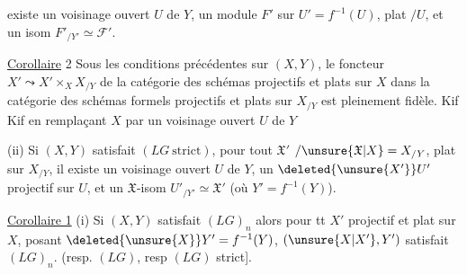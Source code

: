 existe un voisinage ouvert $U$ de $Y$,  un module $F'$ sur $U'=f^{-1}(U)$, plat $/U$, et un isom $F'_{/Y'}\simeq\mathcal F'$.

\uline{Corollaire} 2 Sous les conditions précédentes sur $(X,Y)$,  le foncteur $X'\leadsto X'\times_X X_{/Y}$ de la catégorie des schémas  projectifs et plats sur $X$ dans la catégorie des schémas formels projectifs et plats sur $X_{/Y}$ est pleinement fidèle. Kif Kif en remplaçant $X$ par un voisinage ouvert $U$ de $Y$


(ii) Si $(X,Y)$ satisfait $(LG\ \text{strict})$, pour tout $\mathfrak X'$   $/\unsure{\mathfrak X|X}=X_{/Y}$, plat sur $X_{/Y}$, il existe un voisinage ouvert $U$ de $Y$,  un $\deleted{\unsure{X'}}U'$ projectif   sur $U$, et un $\mathfrak X$-isom $U'_{/Y'}\simeq\mathfrak X'$ (où $Y'=f^{-1}(Y)$).

\uline{Corollaire 1}   (i) Si $(X,Y)$ satisfait $(LG)_n$   alors pour tt $X'$ projectif et plat sur $X$, posant $\deleted{\unsure{X}}Y'=f^{-1}(Y)$, $(\unsure{X|X'},Y')$ satisfait $(LG)_n$.  (resp. $(LG)$, resp $(LG)$ strict].
